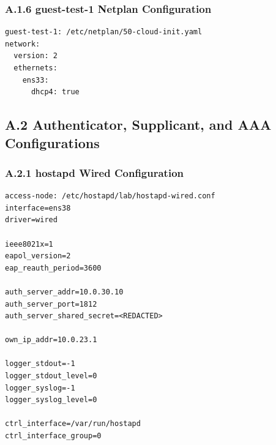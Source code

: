 \documentclass[11pt]{article}
\begin{document}
\subsubsection{A.1.6 guest-test-1 Netplan Configuration}
\label{sec:appendix-a-guest-test-1-netplan-config}

\begin{verbatim}
guest-test-1: /etc/netplan/50-cloud-init.yaml
network:
  version: 2
  ethernets:
    ens33:
      dhcp4: true
\end{verbatim}


\subsection{A.2 Authenticator, Supplicant, and AAA Configurations}
\label{sec:appendix-a-authenticator-supplicant-and-aaa-configurations}


\subsubsection{A.2.1 hostapd Wired Configuration}
\label{sec:appendix-a-access-node-hostapd-wired-config}

\begin{verbatim}
access-node: /etc/hostapd/lab/hostapd-wired.conf
interface=ens38
driver=wired

ieee8021x=1
eapol_version=2
eap_reauth_period=3600

auth_server_addr=10.0.30.10
auth_server_port=1812
auth_server_shared_secret=<REDACTED>

own_ip_addr=10.0.23.1

logger_stdout=-1
logger_stdout_level=0
logger_syslog=-1
logger_syslog_level=0

ctrl_interface=/var/run/hostapd
ctrl_interface_group=0
\end{verbatim}
\end{document}
